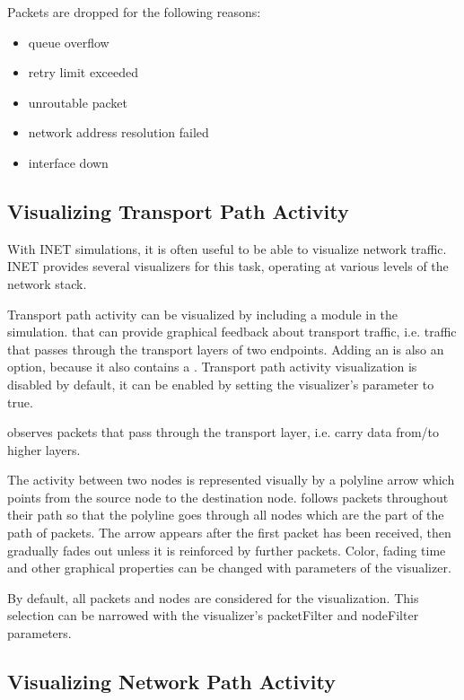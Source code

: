 Packets are dropped for the following reasons:

\begin{itemize}
  \item queue overflow
  \item retry limit exceeded
  \item unroutable packet
  \item network address resolution failed
  \item interface down
\end{itemize}


\subsection{Visualizing Transport Path Activity}

With INET simulations, it is often useful to be able to visualize network
traffic. INET provides several visualizers for this task, operating at various
levels of the network stack.

Transport path activity can be visualized by including a
 module in the simulation. 
that can provide graphical feedback about transport traffic, i.e. traffic that passes
through the transport layers of two endpoints. Adding an  is
also an option, because it also contains a . Transport
path activity visualization is disabled by default, it can be enabled by setting
the visualizer's  parameter to true.

 observes packets that pass through the transport layer,
i.e. carry data from/to higher layers.

The activity between two nodes is represented visually by a polyline arrow which
points from the source node to the destination node. 
follows packets throughout their path so that the polyline goes through all
nodes which are the part of the path of packets. The arrow appears after the
first packet has been received, then gradually fades out unless it is reinforced
by further packets. Color, fading time and other graphical properties can be
changed with parameters of the visualizer.

By default, all packets and nodes are considered for the visualization. This
selection can be narrowed with the visualizer's packetFilter and nodeFilter
parameters.

\subsection{Visualizing Network Path Activity}

